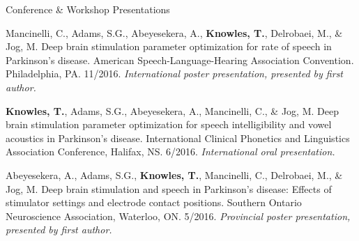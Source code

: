 \documentclass{resume} %
\begin{document}
\begin{rSection}{Conference \& Workshop Presentations}
%	
%	
	
	Mancinelli, C., Adams, S.G., Abeyesekera, A., {\bf Knowles, T.}, Delrobaei, M., \& Jog, M. Deep brain stimulation parameter optimization for rate of speech in Parkinson's disease. American Speech-Language-Hearing Association Convention. Philadelphia, PA. 11/2016. \emph{International poster presentation, presented by first author.}
	
	{\bf Knowles, T.}, Adams, S.G., Abeyesekera, A., Mancinelli, C., \& Jog, M. Deep brain stimulation parameter optimization for speech intelligibility and vowel acoustics in Parkinson's disease. International Clinical Phonetics and Linguistics Association Conference, Halifax, NS. 6/2016. \emph{International oral presentation.}
	
	
	Abeyesekera, A., Adams, S.G., {\bf Knowles, T.}, Mancinelli, C., Delrobaei, M., \& Jog, M. Deep brain stimulation and speech in Parkinson's disease: Effects of stimulator settings and electrode contact positions. Southern Ontario Neuroscience Association, Waterloo, ON. 5/2016. \emph{Provincial poster presentation, presented by first author.}
	
	

\end{rSection}
\end{document}
